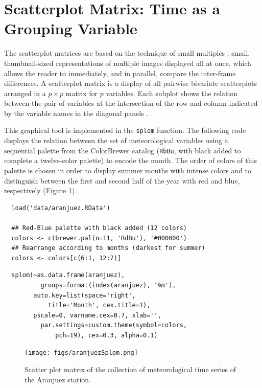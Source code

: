 \documentclass[smallroyalvopaper]{memoir}
\begin{document}
\section{Scatterplot Matrix: Time as a Grouping Variable \label{SEC:groupVariable}}
\label{sec:org3632fd6}

The scatterplot matrices are based on the technique of small multiples
\cite{Tufte1990}: small, thumbnail-sized representations of multiple
images displayed all at once, which allows the reader to immediately,
and in parallel, compare the inter-frame differences.  A scatterplot
matrix is a display of all pairwise bivariate scatterplots arranged in
a \(p \times p\) matrix for \(p\) variables. Each subplot shows the
relation between the pair of variables at the intersection of the row
and column indicated by the variable names in the diagonal panels
\cite{Friendly.Denis2005}.

This graphical tool is implemented in the \texttt{splom} function. The
following code displays the relation between the set of
meteorological variables using a sequential palette from the
ColorBrewer catalog (\texttt{RbBu}, with black added to complete a
twelve-color palette) to encode the month. The order of colors of
this palette is chosen in order to display summer months with
intense colors and to distinguish between the first and second
half of the year with red and blue, respectively (Figure
\ref{fig:aranjuezSplom}).


\lstset{language=r,label= ,caption= ,captionpos=b,numbers=none}
\begin{lstlisting}
  load('data/aranjuez.RData')
  
  ## Red-Blue palette with black added (12 colors)
  colors <- c(brewer.pal(n=11, 'RdBu'), '#000000')
  ## Rearrange according to months (darkest for summer)
  colors <- colors[c(6:1, 12:7)]
\end{lstlisting}

\lstset{language=r,label= ,caption= ,captionpos=b,numbers=none}
\begin{lstlisting}
  splom(~as.data.frame(aranjuez),
          groups=format(index(aranjuez), '%m'),
        auto.key=list(space='right', 
            title='Month', cex.title=1),
        pscale=0, varname.cex=0.7, xlab='',
          par.settings=custom.theme(symbol=colors,
              pch=19), cex=0.3, alpha=0.1)
\end{lstlisting}

\begin{figure}[htbp]
\centering
\texttt{[image: figs/aranjuezSplom.png]}
\caption{Scatter plot matrix of the collection of meteorological time series of the Aranjuez station. \label{fig:aranjuezSplom}}
\end{figure}
\end{document}
